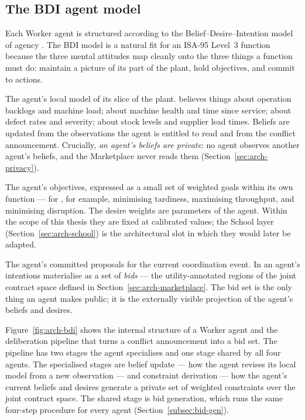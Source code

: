 \subsection{The BDI agent model}
\label{subsec:bdi}

Each Worker agent is structured according to the
Belief--Desire--Intention model of agency \cite{rao1995bdi,wooldridge1995}.
The BDI model is a natural fit for an ISA-95 Level~3 function because
the three mental attitudes map cleanly onto the three things a function
must do: maintain a picture of its part of the plant, hold objectives,
and commit to actions.

\begin{description}[leftmargin=1.4em,style=nextline,itemsep=0.3em]
  \item[Beliefs.] The agent's local model of its slice of the plant.
    \PSA{} believes things about operation backlogs and machine load;
    \PMA{} about machine health and time since service; \QCA{} about
    defect rates and severity; \SCA{} about stock levels and supplier
    lead times. Beliefs are updated from the observations the agent is
    entitled to read and from the conflict announcement. Crucially,
    \emph{an agent's beliefs are private}: no agent observes another
    agent's beliefs, and the Marketplace never reads them
    (Section~\ref{sec:arch-privacy}).
  \item[Desires.] The agent's objectives, expressed as a small set of
    weighted goals within its own function --- for \PSA{}, for example,
    minimising tardiness, maximising throughput, and minimising
    disruption. The desire weights are parameters of the agent. Within
    the scope of this thesis they are fixed at calibrated values; the
    School layer (Section~\ref{sec:arch-school}) is the architectural
    slot in which they would later be adapted.
  \item[Intentions.] The agent's committed proposals for the current
    coordination event. In \NEXUS{} an agent's intentions materialise
    as a set of \emph{bids} --- the utility-annotated regions of the
    joint contract space defined in Section~\ref{sec:arch-marketplace}.
    The bid set is the only thing an agent makes public; it is the
    externally visible projection of the agent's beliefs and desires.
\end{description}

Figure~\ref{fig:arch-bdi} shows the internal structure of a Worker
agent and the deliberation pipeline that turns a conflict announcement
into a bid set. The pipeline has two stages the agent specialises and
one stage shared by all four agents. The specialised stages are belief
update --- how the agent revises its local model from a new observation
--- and constraint derivation --- how the agent's current beliefs and
desires generate a private set of weighted constraints over the joint
contract space. The shared stage is bid generation, which runs the same
four-step procedure for every agent (Section~\ref{subsec:bid-gen}).

